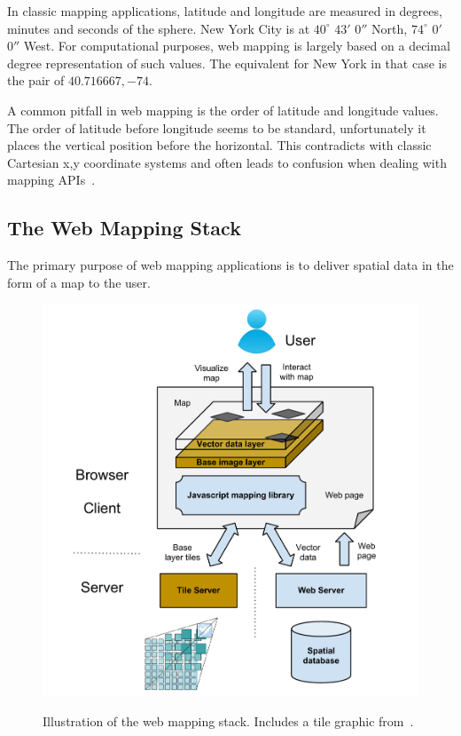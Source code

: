 In classic mapping applications, latitude and longitude are measured in degrees, minutes and seconds of the sphere. New York City is at $40^\circ$ $43'$ $0''$ North, $74^\circ$ $0'$ $0''$ West. For computational purposes, web mapping is largely based on a decimal degree representation of such values. The equivalent for New York in that case is the pair of $40.716667, -74$.

A common pitfall in web mapping is the order of latitude and longitude values. The order of latitude before longitude seems to be standard, unfortunately it places the vertical position before the horizontal. This contradicts with classic Cartesian x,y coordinate systems and often leads to confusion when dealing with mapping APIs~\cite{Zzolo11mappingdrupal}. 

\cite{asd}


\subsection{The Web Mapping Stack}

The primary purpose of web mapping applications is to deliver spatial data in the form of a map to the user. 

\begin{figure}[h]
  \begin{center}
    \includegraphics[width=1\textwidth]{figures/web_mapping_stack.pdf}
    \label{fig:mercator}
    \caption{Illustration of the web mapping stack. Includes a tile graphic from~\cite{web:cubeservtiles}.}
  \end{center}
\end{figure}















